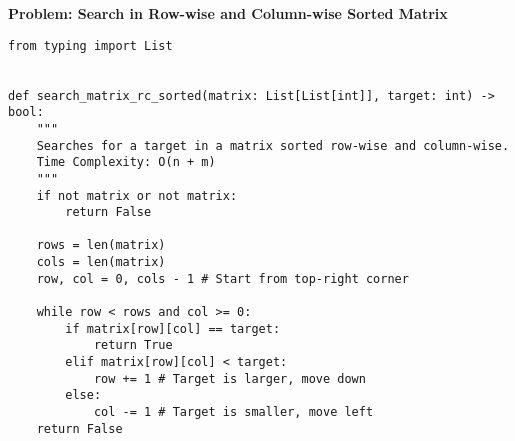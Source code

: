 \noindent\textbf{Problem: Search in Row-wise and Column-wise Sorted Matrix}
\begin{verbatim}
from typing import List


def search_matrix_rc_sorted(matrix: List[List[int]], target: int) -> bool:
    """
    Searches for a target in a matrix sorted row-wise and column-wise.
    Time Complexity: O(n + m)
    """
    if not matrix or not matrix:
        return False

    rows = len(matrix)
    cols = len(matrix)
    row, col = 0, cols - 1 # Start from top-right corner

    while row < rows and col >= 0:
        if matrix[row][col] == target:
            return True
        elif matrix[row][col] < target:
            row += 1 # Target is larger, move down
        else:
            col -= 1 # Target is smaller, move left
    return False
\end{verbatim}

